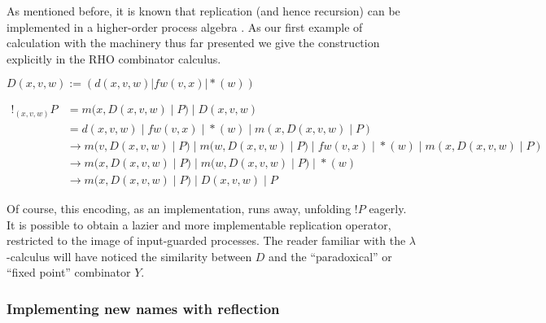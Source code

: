 \documentclass{llncs}
\newcommand{\bangp}[1]{! #1}
\newcommand{\red}{\rightarrow}
\begin{document}
% 
% 
% 
% 
% 
As mentioned before, it is known that replication (and hence
recursion) can be implemented in a higher-order process algebra
\cite{SangiorgiWalker}. As our first example of calculation with the
machinery thus far presented we give the construction explicitly in
the RHO combinator calculus.

\begin{definition}[Replication]
  $D(x,v,w) := (d(x,v,w) | fw(v,x) | {*}(w))$
\end{definition}
\[\begin{array}{rl}
  !_{(x,v,w)} P &= m(x,D(x,v,w) \; |\; P) \; |\; D(x,v,w) \\
        &= d(x,v,w) \; |\; fw(v,x) \; |\; {*}(w) \; |\; m(x,D(x,v,w) \; |\; P) \\
        &\red m(v,D(x,v,w) \; |\; P) \; |\; m(w,D(x,v,w) \; |\; P) \; |\; fw(v,x) \; |\; {*}(w) \; |\; m(x,D(x,v,w) \; |\; P) \\
        &\red m(x,D(x,v,w) \; |\; P) \; |\; m(w,D(x,v,w) \; |\; P) \; |\; {*}(w) \\
        &\red m(x,D(x,v,w) \; |\; P) \; |\; D(x,v,w) \; |\; P
\end{array}\]

Of course, this encoding, as an implementation, runs away, unfolding
$\bangp{P}$ eagerly. It is possible to obtain a lazier and more
implementable replication operator, restricted to the image of
input-guarded processes. The reader familiar with the
$\lambda$-calculus will have noticed the similarity between $D$ and
the ``paradoxical'' or ``fixed point'' combinator $Y$.

\subsubsection{Implementing new names with reflection}
\end{document}
